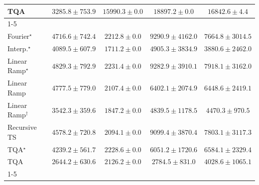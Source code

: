 \begin{tabular}{l|cccc|}
TQA & {\cellcolor[HTML]{FCFED6}} \color[HTML]{000000} $3285.8\pm 753.9$ & {\cellcolor[HTML]{E5F5AC}} \color[HTML]{000000} $15990.3\pm 0.0$ & {\cellcolor[HTML]{DDF1A6}} \color[HTML]{000000} $18897.2\pm 0.0$ & {\cellcolor[HTML]{E2F4AA}} \color[HTML]{000000} $16842.6\pm 4.4$ \\
\cline{1-5}
\multicolumn{5}{c}{\rule{0pt}{8pt}SV} \\
\midrule
Fourier$^\star$ & {\cellcolor[HTML]{9EBAD9}} \color[HTML]{000000} $4716.6\pm 742.4$ & {\cellcolor[HTML]{F5EFF6}} \color[HTML]{000000} $2212.8\pm 0.0$ & {\cellcolor[HTML]{023858}} \color[HTML]{F1F1F1} $9290.9\pm 4162.0$ & {\cellcolor[HTML]{0569A5}} \color[HTML]{F1F1F1} $7664.8\pm 3014.5$ \\
Interp.$^\star$ & {\cellcolor[HTML]{BBC7E0}} \color[HTML]{000000} $4089.5\pm 607.9$ & {\cellcolor[HTML]{FFF7FB}} \color[HTML]{000000} $1711.2\pm 0.0$ & {\cellcolor[HTML]{94B6D7}} \color[HTML]{000000} $4905.3\pm 3834.9$ & {\cellcolor[HTML]{C4CBE3}} \color[HTML]{000000} $3880.6\pm 2462.0$ \\
Linear Ramp$^\star$ & {\cellcolor[HTML]{97B7D7}} \color[HTML]{000000} $4829.3\pm 792.9$ & {\cellcolor[HTML]{F5EEF6}} \color[HTML]{000000} $2231.4\pm 0.0$ & {\cellcolor[HTML]{023858}} \color[HTML]{F1F1F1} $9282.9\pm 3910.1$ & {\cellcolor[HTML]{04649D}} \color[HTML]{F1F1F1} $7918.1\pm 3162.0$ \\
Linear Ramp & {\cellcolor[HTML]{9AB8D8}} \color[HTML]{000000} $4777.5\pm 779.0$ & {\cellcolor[HTML]{F7F0F7}} \color[HTML]{000000} $2107.4\pm 0.0$ & {\cellcolor[HTML]{3991C1}} \color[HTML]{F1F1F1} $6402.1\pm 2074.9$ & {\cellcolor[HTML]{358FC0}} \color[HTML]{F1F1F1} $6448.6\pm 2419.1$ \\
Linear Ramp$^\dagger$ & {\cellcolor[HTML]{D2D3E7}} \color[HTML]{000000} $3542.3\pm 359.6$ & {\cellcolor[HTML]{FDF5FA}} \color[HTML]{000000} $1847.2\pm 0.0$ & {\cellcolor[HTML]{97B7D7}} \color[HTML]{000000} $4839.5\pm 1178.5$ & {\cellcolor[HTML]{A9BFDC}} \color[HTML]{000000} $4470.3\pm 970.5$ \\
Recursive TS & {\cellcolor[HTML]{A5BDDB}} \color[HTML]{000000} $4578.2\pm 720.8$ & {\cellcolor[HTML]{F8F1F8}} \color[HTML]{000000} $2094.1\pm 0.0$ & {\cellcolor[HTML]{023E62}} \color[HTML]{F1F1F1} $9099.4\pm 3870.4$ & {\cellcolor[HTML]{0567A1}} \color[HTML]{F1F1F1} $7803.1\pm 3117.3$ \\
TQA$^\star$ & {\cellcolor[HTML]{B4C4DF}} \color[HTML]{000000} $4239.2\pm 561.7$ & {\cellcolor[HTML]{F5EEF6}} \color[HTML]{000000} $2228.6\pm 0.0$ & {\cellcolor[HTML]{509AC6}} \color[HTML]{F1F1F1} $6051.2\pm 1720.6$ & {\cellcolor[HTML]{2F8BBE}} \color[HTML]{F1F1F1} $6584.1\pm 2329.4$ \\
TQA & {\cellcolor[HTML]{EDE7F2}} \color[HTML]{000000} $2644.2\pm 630.6$ & {\cellcolor[HTML]{F7F0F7}} \color[HTML]{000000} $2126.2\pm 0.0$ & {\cellcolor[HTML]{E8E4F0}} \color[HTML]{000000} $2784.5\pm 831.0$ & {\cellcolor[HTML]{BDC8E1}} \color[HTML]{000000} $4028.6\pm 1065.1$ \\
\cline{1-5}
\bottomrule
\end{tabular}
